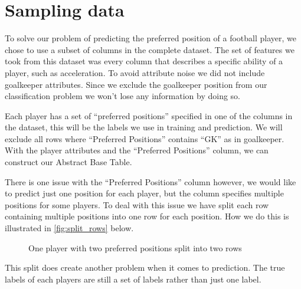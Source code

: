 \section{Sampling data}

To solve our problem of predicting the preferred position of a football player, we chose to use a subset of columns in the complete dataset. The set of features we took from this dataset was every column that describes a specific ability of a player, such as acceleration. To avoid attribute noise we did not include goalkeeper attributes. Since we exclude the goalkeeper position from our classification problem we won't lose any information by doing so. 
\par
Each player has a set of ``preferred positions'' specified in one of the columns in the dataset, this will be the labels we use in training and prediction. We will exclude all rows where ``Preferred Positions'' contains ``GK'' as in goalkeeper. With the player attributes and the ``Preferred Positions'' column, we can construct our Abstract Base Table.
\par
There is one issue with the ``Preferred Positions'' column however, we would like to predict just one position for each player, but the column specifies multiple positions for some players. To deal with this issue we have split each row containing multiple positions into one row for each position. How we do this is illustrated in \autoref{fig:split_rows} below.
\begin{figure}[!ht]
    \centering
    \caption{One player with two preferred positions split into two rows}\label{fig:split_rows}
\end{figure}
\par
This split does create another problem when it comes to prediction. The true labels of each players are still a set of labels rather than just one label. 